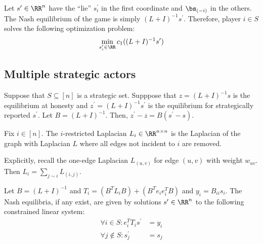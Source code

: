 Let $s^\prime \in \RR^n$ have the ``lie'' $s_i^\prime$ in the first coordinate and $\bs_{(-i)}$ in the others. The Nash equilibrium of the game is simply $(L + I)^{-1} s^\prime$. Therefore, player $i \in S$ solves the following optimization problem: 
\[
\min\limits_{s_i^\prime \in \RR} c_1((L + I)^{-1} s^\prime)
\]







\subsection{Multiple strategic actors}

Suppose that $S \subseteq [n]$ is a strategic set. Supppose that $z = (L + I)^{-1} s$ is the equilibrium at honesty and $z^\prime = (L + I)^{-1} s^\prime$ is the equilibrium for strategically reported $s^\prime$. Let $B = (L + I)^{-1}$. Then, $z^\prime - z = B(s^\prime - s)$. 

\begin{defn}
Fix $i \in [n]$. The $i$-restricted Laplacian $L_i \in \RR^{n \times n}$ is the Laplacian of the graph with Laplacian $L$ where all edges not incident to $i$ are removed. 
\end{defn}

Explicitly, recall the one-edge Laplacian $L_{(u,v)}$ for edge $(u,v)$ with weight $w_{uv}$. Then $L_i = \sum_{j \sim i} L_{(i,j)}$. 

\begin{prop}
Let $B = (L + I)^{-1}$ and $T_i = (B^T L_i B) + (B^T e_i e_i^T B)$ and $y_i = B_{ii} s_i$. The Nash equilibria, if any exist, are given by solutions $s^\prime \in \RR^n$ to the following constrained linear system: 
\begin{align*}
\forall i \in S: e_i^T T_i s^\prime &= y_i \\
\forall j \not \in S: s_j^\prime &= s_j 
\end{align*}
\end{prop}


